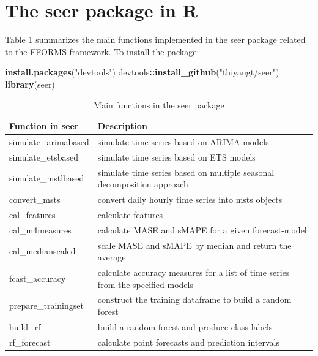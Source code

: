 \documentclass[11pt,a4paper,]{article}
\newenvironment{Shaded}{\begin{snugshade}}{\end{snugshade}}
\newcommand{\KeywordTok}[1]{\textcolor[rgb]{0.13,0.29,0.53}{\textbf{#1}}}
\newcommand{\StringTok}[1]{\textcolor[rgb]{0.31,0.60,0.02}{#1}}
\newcommand{\OperatorTok}[1]{\textcolor[rgb]{0.81,0.36,0.00}{\textbf{#1}}}
\newcommand{\NormalTok}[1]{#1}
\theoremstyle{definition}
\theoremstyle{definition}
\theoremstyle{definition}
\theoremstyle{remark}
\begin{document}
\section{The seer package in R}\label{the-seer-package-in-r}

Table \ref{seer} summarizes the main functions implemented in the seer
package related to the FFORMS framework. To install the package:

\begin{Shaded}
\begin{Highlighting}[]
\KeywordTok{install.packages}\NormalTok{(}\StringTok{"devtools"}\NormalTok{)}
\NormalTok{devtools}\OperatorTok{::}\KeywordTok{install_github}\NormalTok{(}\StringTok{"thiyangt/seer"}\NormalTok{)}
\KeywordTok{library}\NormalTok{(seer)}
\end{Highlighting}
\end{Shaded}

\begin{table}[!h]
\centering\small\tabcolsep=0.12cm
\caption{Main functions in the seer package}
\label{seer}
\begin{tabular}{l|l}
Function in seer & Description \\\hline
simulate\_arimabased & simulate time series based on ARIMA models \\
simulate\_etsbased & simulate time series based on ETS models \\
simulate\_mstlbased & simulate time series based on multiple seasonal decomposition approach \\
convert\_msts & convert daily hourly time series into msts objects \\
cal\_features & calculate features \\
cal\_m4measures & calculate MASE and sMAPE for a given forecast-model \\
cal\_medianscaled & scale MASE and sMAPE by median and return the average \\
fcast\_accuracy & calculate accuracy measures for a list of time series from the specified models\\
prepare\_trainingset & construct the training dataframe to build a random forest\\
build\_rf &  build a random forest and produce class labels\\
rf\_forecast & calculate point forecasts and prediction intervals\\\hline
\end{tabular}
\end{table}

\newpage

\printbibliography
\end{document}
